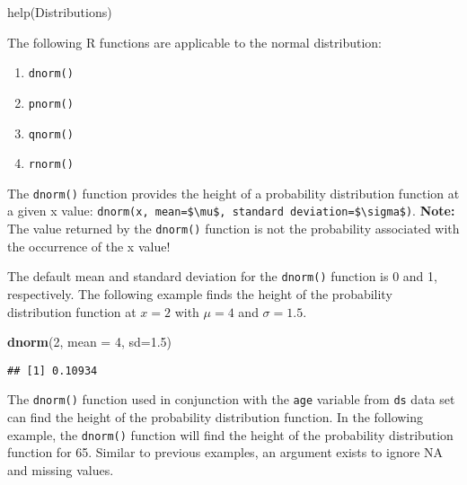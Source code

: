 \documentclass[]{article}
\newenvironment{Shaded}{\begin{snugshade}}{\end{snugshade}}
\newcommand{\KeywordTok}[1]{\textcolor[rgb]{0.13,0.29,0.53}{\textbf{#1}}}
\newcommand{\DataTypeTok}[1]{\textcolor[rgb]{0.13,0.29,0.53}{#1}}
\newcommand{\DecValTok}[1]{\textcolor[rgb]{0.00,0.00,0.81}{#1}}
\newcommand{\FloatTok}[1]{\textcolor[rgb]{0.00,0.00,0.81}{#1}}
\newcommand{\OperatorTok}[1]{\textcolor[rgb]{0.81,0.36,0.00}{\textbf{#1}}}
\newcommand{\NormalTok}[1]{#1}
\providecommand{\tightlist}{%
  \setlength{\itemsep}{0pt}\setlength{\parskip}{0pt}}
\begin{document}
help(Distributions)

The following R functions are applicable to the normal distribution:

\begin{enumerate}
\def\labelenumi{\arabic{enumi}.}
\tightlist
\item
  \texttt{dnorm()}
\item
  \texttt{pnorm()}
\item
  \texttt{qnorm()}
\item
  \texttt{rnorm()}
\end{enumerate}

The \texttt{dnorm()} function provides the height of a probability
distribution function at a given x value:
\texttt{dnorm(x,\ mean=\$\textbackslash{}mu\$,\ standard\ deviation=\$\textbackslash{}sigma\$)}.
\textbf{Note:} The value returned by the \texttt{dnorm()} function is
not the probability associated with the occurrence of the x value!

The default mean and standard deviation for the \texttt{dnorm()}
function is 0 and 1, respectively. The following example finds the
height of the probability distribution function at \(x=2\) with
\(\mu = 4\) and \(\sigma = 1.5\).

\begin{Shaded}
\begin{Highlighting}[]
\KeywordTok{dnorm}\NormalTok{(}\DecValTok{2}\NormalTok{, }\DataTypeTok{mean =} \DecValTok{4}\NormalTok{, }\DataTypeTok{sd=}\FloatTok{1.5}\NormalTok{)}
\end{Highlighting}
\end{Shaded}

\begin{verbatim}
## [1] 0.10934
\end{verbatim}

The \texttt{dnorm()} function used in conjunction with the \texttt{age}
variable from \texttt{ds} data set can find the height of the
probability distribution function. In the following example, the
\texttt{dnorm()} function will find the height of the probability
distribution function for 65. Similar to previous examples, an argument
exists to ignore NA and missing values.

\begin{Shaded}
\end{Shaded}
\end{document}
